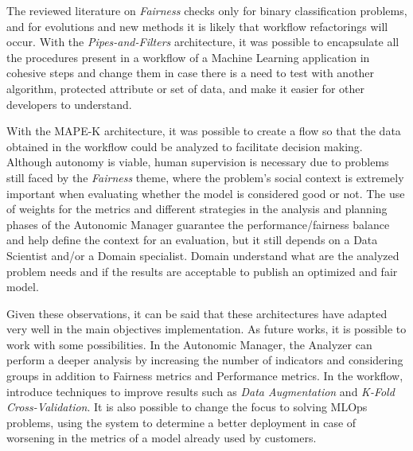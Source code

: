 \documentclass[sigconf]{acmart}
\begin{document}
The reviewed literature on \textit{Fairness} checks only for binary classification problems, and for evolutions and new methods it is likely that workflow refactorings will occur. With the \textit{Pipes-and-Filters} architecture, it was possible to encapsulate all the procedures present in a workflow of a Machine Learning application in cohesive steps and change them in case there is a need to test with another algorithm, protected attribute or set of data, and make it easier for other developers to understand.

With the MAPE-K architecture, it was possible to create a flow so that the data obtained in the workflow could be analyzed to facilitate decision making. Although autonomy is viable, human supervision is necessary due to problems still faced by the \textit{Fairness} theme, where the problem's social context is extremely important when evaluating whether the model is considered good or not. The use of weights for the metrics and different strategies in the analysis and planning phases of the Autonomic Manager guarantee the performance/fairness balance and help define the context for an evaluation, but it still depends on a Data Scientist and/or a Domain specialist. Domain understand what are the analyzed problem needs and if the results are acceptable to publish an optimized and fair model.

Given these observations, it can be said that these architectures have adapted very well in the main objectives implementation. As future works, it is possible to work with some possibilities. In the Autonomic Manager, the Analyzer can perform a deeper analysis by increasing the number of indicators and considering groups in addition to Fairness metrics and Performance metrics. In the workflow, introduce techniques to improve results such as \textit{Data Augmentation} and \textit{K-Fold Cross-Validation}. It is also possible to change the focus to solving MLOps problems, using the system to determine a better deployment in case of worsening in the metrics of a model already used by customers.



\end{document}
